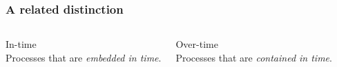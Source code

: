 \documentclass[]{beamer}
\begin{document}

\begin{frame}
  \frametitle{A related distinction}
  \begin{columns}[c]
    \begin{block}{}
      \alert{In-time}\\
       Processes that are \emph{embedded in time}.
    \end{block}
    \pause[2] 
    \begin{block}{}
      \alert{Over-time}\\
      Processes that are \emph{contained in time}.
    \end{block}
  \end{columns}
\end{frame}
\end{document}
